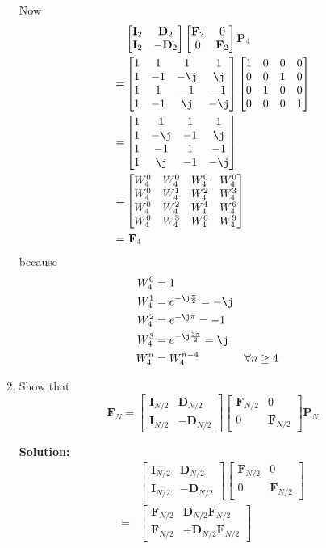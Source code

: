 \documentclass[journal,12pt,twocolumn]{IEEEtran}
\newcommand{\solution}{\noindent \textbf{Solution: }}
\let\vec\mathbf
\numberwithin{equation}{section}
\renewcommand\thesection{\arabic{section}}
\newcommand{\mymat}[1]{\ensuremath{\begin{bmatrix}#1\end{bmatrix}}}
\begin{document}
\begin{enumerate}[label=\thesection.\arabic*]
	Now
	\begin{align}
		&\mymat{\vec{I}_2 & \vec{D}_2 \\ \vec{I}_2 & -\vec{D}_2} \mymat{\vec{F}_2 & 0 \\ 0 & \vec{F}_2} \vec{P}_4 \\
		= &\mymat{1 & 1 & 1 & 1 \\ 1 & -1 & -\j & \j \\ 1 & 1 & -1 & -1 \\ 1 & -1 & \j & -\j} \mymat{1 & 0 & 0 & 0 \\ 0 & 0 & 1 & 0 \\ 0 & 1 & 0 & 0 \\ 0 & 0 & 0 & 1} \\
		= &\mymat{1 & 1 & 1 & 1 \\ 1 & -\j & -1 & \j \\ 1 & -1 & 1 & -1 \\ 1 & \j & -1 & -\j} \\
		= &\mymat{W_4^0 & W_4^0 & W_4^0 & W_4^0 \\ W_4^0 & W_4^1 & W_4^2 & W_4^3 \\ W_4^0 & W_4^2 & W_4^4 & W_4^6 \\ W_4^0 & W_4^3 & W_4^6 & W_4^9} \\
		= &~\vec{F}_4
	\end{align}
	because
	\begin{align}
		W_4^0 &= 1 \\
		W_4^1 &= e^{-\j\frac{\pi}{2}} = -\j \\
		W_4^2 &= e^{-\j\pi} = -1 \\
		W_4^3 &= e^{-\j\frac{3\pi}{2}} = \j \\
		W_4^n &= W_4^{n - 4} &&\forall n \ge 4
	\end{align}	 	
	
\item Show that 
\begin{equation}
\vec{F}_{N}=
\begin{bmatrix}
\vec{I}_{N/2} & \vec{D}_{N/2} \\
\vec{I}_{N/2} & -\vec{D}_{N/2}
\end{bmatrix}
\begin{bmatrix}
\vec{F}_{N/2} & 0 \\
0 & \vec{F}_{N/2}
\end{bmatrix}
\vec{P}_{N}
\end{equation}

	\solution
	\begin{align}
		&\mymat{\vec{I}_{N/2} & \vec{D}_{N/2} \\ \vec{I}_{N/2} & -\vec{D}_{N/2}} \mymat{\vec{F}_{N/2} & 0 \\ 0 & \vec{F}_{N/2}}  \\
		= &\mymat{\vec{F}_{N/2} & \vec{D}_{N/2}\vec{F}_{N/2} \\ \vec{F}_{N/2} & -\vec{D}_{N/2}\vec{F}_{N/2}}
	\end{align}
	

\end{enumerate}
\end{document}
